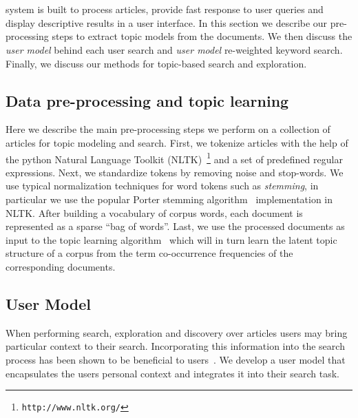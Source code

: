 \section{\system}
\label{sec:system}


{\system} system is built to process articles,
provide fast response to user queries and display descriptive
results in a user interface.
In this section we describe our pre-processing steps to extract
topic models from the documents.
We then discuss the \textsl{user model} behind each user search and 
\textsl{user model} re-weighted keyword search.
Finally, we discuss our methods for topic-based search and exploration.



\subsection{Data pre-processing and topic learning}

Here we describe the main pre-processing steps we perform on a 
collection of articles for topic modeling and search. First, 
we tokenize articles with the help of the python 
Natural Language Toolkit (NLTK)~\footnote{\texttt{http://www.nltk.org/}} and a set of 
predefined regular expressions. Next, we standardize tokens by 
removing noise and stop-words. We use typical normalization 
techniques for word tokens such as \textsl{stemming}, in particular we use the popular Porter stemming algorithm~\cite{Porter1980} 
implementation in NLTK\@. 
After building a vocabulary of corpus words, each document is represented as a sparse ``bag of words''.
Last, we use the processed documents as input to the topic 
learning algorithm~\cite{hoffman2010online} which will in turn learn 
the latent topic structure of a corpus from the term co-occurrence 
frequencies of the corresponding documents. %



\subsection{User Model}
When performing search, exploration and discovery over articles 
users may bring particular context to their search. Incorporating 
this information into the search process has been shown to be 
beneficial to users~\cite{DZSRWJ,MZPGSOL}. We develop a user model 
that encapsulates the users personal context and integrates it into 
their search task. 

